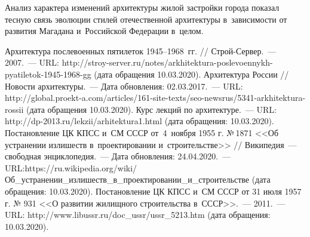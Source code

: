 Анализ характера изменений архитектуры жилой застройки города показал тесную связь эволюции стилей отечественной архитектуры в~зависимости от развития Магадана и~Российской Федерации в~целом.

\begin{thebibliography}{99}
\bibitem{}Архитектура послевоенных пятилеток 1945--1968~гг. // Строй-Сервер.~--- 2007.~--- URL: http://stroy-server.ru/notes/arkhitektura-poslevoennykh-pyatiletok-1945-1968-gg (дата обращения 10.03.2020).
\bibitem{}Архитектура России // Новости архитектуры.~--- Дата обновления: 02.03.2017.~--- URL: http://global.proekt-a.com/articles/161-site-texts/seo-newsrus/5341-arkhitektura-rossii (дата обращения 10.03.2020).
\bibitem{}Курс лекций по архитектуре.~--- URL: http://dp-2013.ru/lekzii/arhitektura1.html (дата обращения: 10.03.2020).
\bibitem{}Постановление ЦК КПСС и~СМ СССР от 4 ноября 1955 г. №\,1871 <<Об устранении излишеств в~проектировании и~строительстве>> // Википедия~--- свободная энциклопедия.~--- Дата обновления: 24.04.2020.~--- URL:https://ru.wikipedia.org/wiki/Об\_устранении\_излишеств\_в\_про\-ек\-ти\-ро\-ван\-ии\_и\_строительстве (дата обращения: 10.03.2020).
\bibitem{}Постановление ЦК КПСС и~СМ СССР от 31 июля 1957 г. № 931 <<О развитии жилищного строительства в~СССР>>.~--- 2011.~--- URL: http://www.libussr.ru/doc\_ussr/ussr\_5213.htm (дата обращения: 10.03.2020).


\end{thebibliography}
